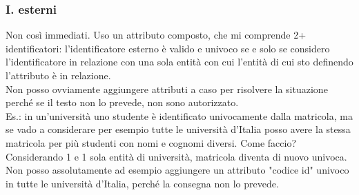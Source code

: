 \subsubsection{I. esterni}
Non così immediati. Uso un attributo composto, che mi comprende 2+ identificatori: l'identificatore esterno è valido e univoco se e solo se considero l'identificatore in relazione con una sola entità con cui l'entità di cui sto definendo l'attributo è in relazione.
\\Non posso ovviamente aggiungere attributi a caso per risolvere la situazione perché se il testo non lo prevede, non sono autorizzato.
\\Es.: in un'università uno studente è identificato univocamente dalla matricola, ma se vado a considerare per esempio tutte le università d'Italia posso avere la stessa matricola per più studenti con nomi e cognomi diversi. Come faccio? Considerando 1 e 1 sola entità di università, matricola diventa di nuovo univoca. Non posso assolutamente ad esempio aggiungere un attributo "codice id" univoco in tutte le università d'Italia, perché la consegna non lo prevede.
